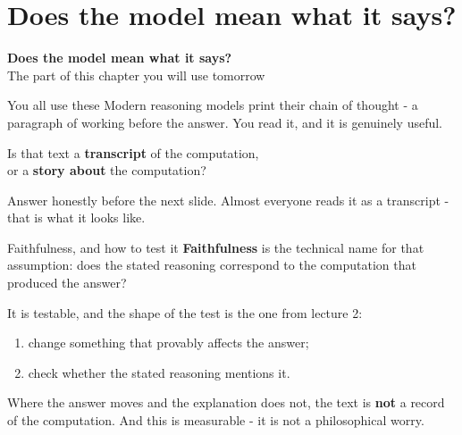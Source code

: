 \documentclass[aspectratio=169]{beamer}
\newcommand{\trapbox}[1]{%
  \begin{tcolorbox}[colback=armred!8, colframe=armred, boxrule=0.6pt, arc=2pt]
  #1
  \end{tcolorbox}}
\newcommand{\sectiontransition}[2]{%
  \begin{frame}[plain]
    \vfill
    \begin{center}
      {\Huge\bfseries\color{popblue} #1}\\[1.1em]
      {\large #2}
    \end{center}
    \vfill
  \end{frame}}
\begin{document}
\section{Does the model mean what it says?}
\sectiontransition{Does the model mean what it says?}{The part of this chapter you will use tomorrow}

\begin{frame}{You all use these}
  \vspace{0.8em}
  Modern reasoning models print their chain of thought - a paragraph of working before the
  answer. You read it, and it is genuinely useful.

  \vspace{1.0em}
  \begin{center}
    {\large Is that text a \textbf{transcript} of the computation,\\ or a \textbf{story about}
    the computation?}
  \end{center}

  \vspace{1.0em}
  \begin{center}
    {\footnotesize Answer honestly before the next slide. Almost everyone reads it as a
    transcript - that is what it looks like.}
  \end{center}
\end{frame}

\begin{frame}{Faithfulness, and how to test it}
  \vspace{0.7em}
  \textbf{Faithfulness} is the technical name for that assumption: does the stated reasoning
  correspond to the computation that produced the answer?

  \vspace{0.8em}
  It is testable, and the shape of the test is the one from lecture 2:

  \vspace{0.5em}
  \begin{enumerate}
    \item change something that provably affects the answer;
    \item check whether the stated reasoning mentions it.
  \end{enumerate}

  \vspace{0.9em}
  \trapbox{Where the answer moves and the explanation does not, the text is \textbf{not} a
  record of the computation. And this is measurable - it is not a philosophical worry.}
\end{frame}
\end{document}
